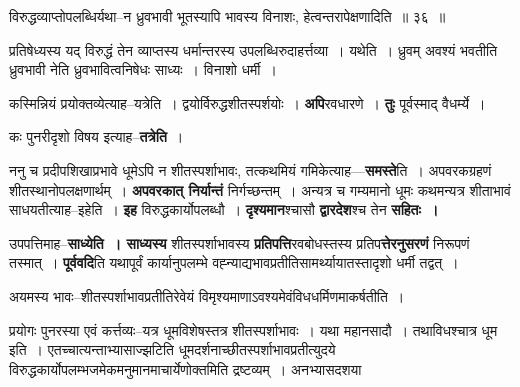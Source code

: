 \documentclass[article,12pt,a4paper]{memoir}
\begin{document}
	  \bigskip
	  \begingroup
	

	  \pstart विरुद्धव्याप्तोपलब्धिर्यथा--न ध्रुवभावी भूतस्यापि भावस्य विनाशः, हेत्वन्तरापेक्षणादिति ॥ ३६ ॥
	\pend
      
	  \endgroup
	 

	  \pstart प्रतिषेध्यस्य यद् विरुद्धं तेन व्याप्तस्य धर्मान्तरस्य उपलब्धिरुदाहर्त्तव्या । यथेति । ध्रुवम् अवश्यं भवतीति ध्रुवभावी नेति ध्रुवभावित्वनिषेधः साध्यः । विनाशो धर्मी ।
	\pend
      
	  \endgroup
	

	  \pstart कस्मिन्नियं प्रयोक्तव्येत्याह--यत्रेति । द्वयोर्विरुद्धशीतस्पर्शयोः । \textbf{अपि}रवधारणे । \textbf{तुः} पूर्वस्माद् वैधर्म्ये ।
	\pend
      

	  \pstart कः पुनरीदृशो विषय इत्याह--\textbf{तत्रेति} ।
	\pend
      

	  \pstart ननु च प्रदीपशिखाप्रभावे धूमेऽपि न शीतस्पर्शाभावः, तत्कथमियं गमिकेत्याह—\textbf{समस्ते}ति । अपवरकग्रहणं शीतस्थानोपलक्षणार्थम् । \textbf{अपवरकात् निर्यान्तं} निर्गच्छन्तम् । अन्यत्र च गम्यमानो धूमः कथमन्यत्र शीताभावं साधयतीत्याह--इहेति । \textbf{इह} विरुद्धकार्योपलब्धौ । \textbf{दृश्यमान}श्चासौ \textbf{द्वारदेश}श्च तेन \textbf{सहितः ।}
	\pend
      

	  \pstart उपपत्तिमाह--\textbf{साध्येति । साध्यस्य} शीतस्पर्शाभावस्य \textbf{प्रतिपत्ति}रवबोधस्तस्य प्रतिप\textbf{त्तेरनुसरणं} निरूपणं तस्मात् । \textbf{पूर्ववदि}ति यथापूर्वं कार्यानुपलम्भे वह्न्याद्यभावप्रतीतिसामर्थ्यायातस्तादृशो धर्मी तद्वत् ।
	\pend
      

	  \pstart अयमस्य भावः--शीतस्पर्शाभावप्रतीतिरेवेयं विमृश्यमाणाऽवश्यमेवंविधधर्मिणमाकर्षतीति ।
	\pend
      

	  \pstart प्रयोगः पुनरस्या एवं कर्त्तव्यः--यत्र धूमविशेषस्तत्र शीतस्पर्शाभावः । यथा महानसादौ । तथाविधश्चात्र धूम इति । एतच्चात्यन्ताभ्यासाज्झटिति धूमदर्शनाच्छीतस्पर्शाभावप्रतीत्युदये विरुद्धकार्योपलम्भजमेकमनुमानमाचार्येणोक्तमिति द्रष्टव्यम् । अनभ्यासदशया  \leavevmode{} 
	  
\end{document}
